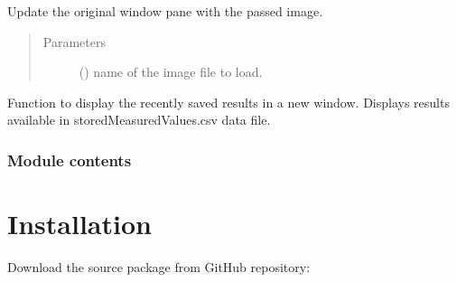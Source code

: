 \documentclass[letterpaper,10pt,english]{sphinxmanual}
\begin{document}
\begin{fulllineitems}
\begin{fulllineitems}
\label{\detokenize{pyleaf.leaf_area_calculator_gui:pyleaf.leaf_area_calculator_gui.LeafAreaCalculatorGUI.update_original_preview}}
Update the original window pane with the passed image.
\begin{quote}\begin{description}
\item[{Parameters}] \leavevmode
{} () \textendash{} name of the image file to load.

\end{description}\end{quote}

\end{fulllineitems}


\begin{fulllineitems}
\label{\detokenize{pyleaf.leaf_area_calculator_gui:pyleaf.leaf_area_calculator_gui.LeafAreaCalculatorGUI.view_results}}
Function to display the recently saved results in a new window.
Displays results available in storedMeasuredValues.csv data file.

\end{fulllineitems}


\end{fulllineitems}



\subsection{Module contents}
\label{\detokenize{pyleaf:module-pyleaf}}\label{\detokenize{pyleaf:module-contents}}

\chapter{Installation}
\label{\detokenize{install:installation}}\label{\detokenize{install::doc}}
Download the source package from GitHub repository:
\end{document}
